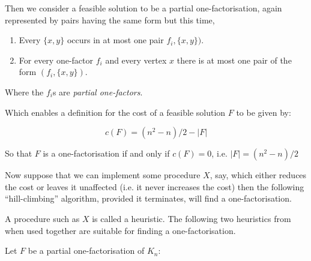 \documentclass[11pt, a4paper]{book}\usepackage[]{graphicx}\usepackage[]{xcolor}
\begin{document}
Then we consider a feasible solution to be a partial
one-factorisation, again represented by pairs having the
same form but this time,

\begin{enumerate}
  \item{Every $\{x, y\}$ occurs in at most one pair $f_i, \{x, y\})$.}
  \item{For every one-factor $f_i$ and every vertex $x$ there is at most one pair of the form $(f_i, \{x, y\})$.}
\end{enumerate}

Where the $f_i$s are
\emph{partial one-factors}.

Which enables a definition for the cost of a feasible solution $F$ to be given by:

$$c(F) = (n^2 - n)/2 - |F|$$

So that $F$ is a one-factorisation if and only if $c(F) = 0$, i.e. $|F| = (n^2 - n)/2$

Now suppose that we can implement some procedure $X$, say,
which either reduces the cost or leaves it unaffected
(i.e. it never increases the cost) then the following
``hill-climbing'' algorithm, provided it terminates,
will find a one-factorisation.

\begin{algorithm}[H]
\end{algorithm}

A procedure such as $X$ is called a heuristic.
The following two heuristics from
\cite{dinitzHillClimbingAlgorithmConstruction1987}
when used together are suitable for finding a
one-factorisation.

Let $F$ be a partial one-factorisation of $K_n$:

\begin{algorithm}[H]
\caption{$H_1$}
\end{algorithm}

\begin{algorithm}[H]
\caption{$H_2$}
\end{algorithm}
\end{document}
